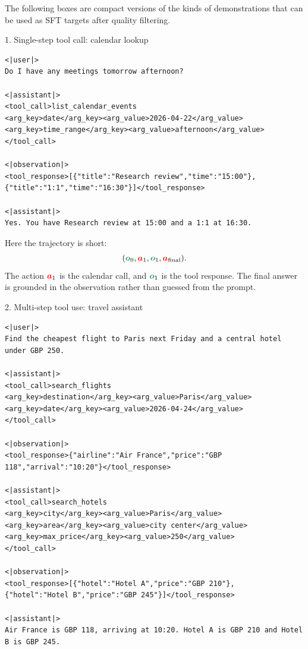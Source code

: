 \documentclass{article}
\newcommand{\colsym}[2]{\ensuremath{\textcolor{#1}{\boldsymbol{#2}}}}
\newcommand{\action}{\colsym{red}{a}}
\newcommand{\obs}{\colsym{ForestGreen}{o}}
\begin{document}
The following boxes are compact versions of the kinds of demonstrations that can be used as SFT targets after quality filtering.

\begin{examplebox}{1. Single-step tool call: calendar lookup}
\begin{lstlisting}
<|user|>
Do I have any meetings tomorrow afternoon?

<|assistant|>
<tool_call>list_calendar_events
<arg_key>date</arg_key><arg_value>2026-04-22</arg_value>
<arg_key>time_range</arg_key><arg_value>afternoon</arg_value>
</tool_call>

<|observation|>
<tool_response>[{"title":"Research review","time":"15:00"},
{"title":"1:1","time":"16:30"}]</tool_response>

<|assistant|>
Yes. You have Research review at 15:00 and a 1:1 at 16:30.
\end{lstlisting}
\end{examplebox}

Here the trajectory is short:
\[
    ({\obs}_0,{\action}_1,{\obs}_1,{\action}_{\mathrm{final}}).
\]
The action ${\action}_1$ is the calendar call, and ${\obs}_1$ is the tool response. The final answer is grounded in the observation rather than guessed from the prompt.

\begin{examplebox}{2. Multi-step tool use: travel assistant}
\begin{lstlisting}
<|user|>
Find the cheapest flight to Paris next Friday and a central hotel under GBP 250.

<|assistant|>
<tool_call>search_flights
<arg_key>destination</arg_key><arg_value>Paris</arg_value>
<arg_key>date</arg_key><arg_value>2026-04-24</arg_value>
</tool_call>

<|observation|>
<tool_response>{"airline":"Air France","price":"GBP 118","arrival":"10:20"}</tool_response>

<|assistant|>
<tool_call>search_hotels
<arg_key>city</arg_key><arg_value>Paris</arg_value>
<arg_key>area</arg_key><arg_value>city center</arg_value>
<arg_key>max_price</arg_key><arg_value>250</arg_value>
</tool_call>

<|observation|>
<tool_response>[{"hotel":"Hotel A","price":"GBP 210"},
{"hotel":"Hotel B","price":"GBP 245"}]</tool_response>

<|assistant|>
Air France is GBP 118, arriving at 10:20. Hotel A is GBP 210 and Hotel B is GBP 245.
\end{lstlisting}
\end{examplebox}
\end{document}
